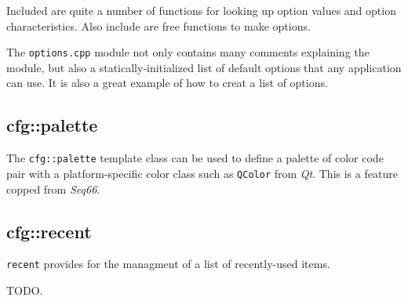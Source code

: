    Included are quite a number of functions for looking up option values
   and option characteristics.
   Also include are free functions to make options.

   The \texttt{options.cpp} module not only contains many comments explaining
   the module, but also a statically-initialized list of
   default options that any application can use.
   It is also a great example of how to creat a list of options.

\subsection{cfg::palette}
\label{subsec:cfg_namespace_}

   The \texttt{cfg::palette} template class can be used to define
   a palette of color code pair with a platform-specific color class
   such as \texttt{QColor} from \textsl{Qt}.
   This is a feature copped from \textsl{Seq66}.

\subsection{cfg::recent}
\label{subsec:cfg_namespace_recent}

   \texttt{recent} provides for the managment of a list of recently-used
   items.

   TODO.

